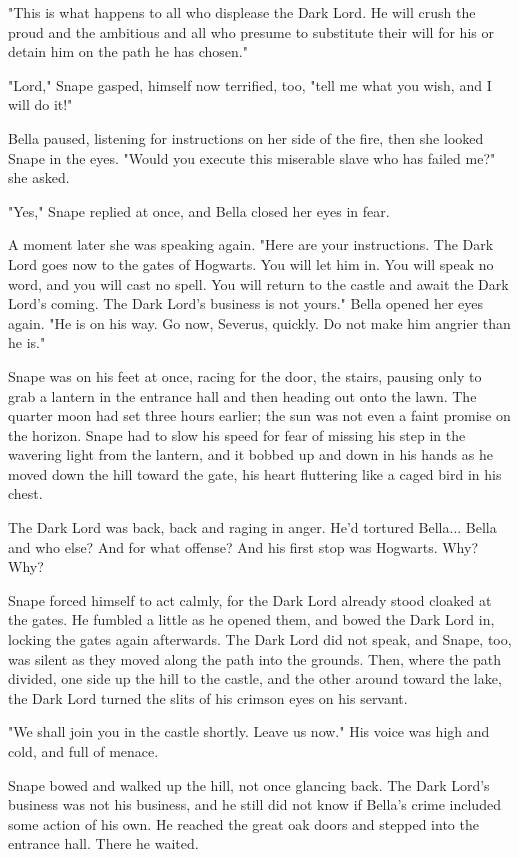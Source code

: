 "This is what happens to all who displease the Dark Lord. He will crush the proud and the ambitious and all who presume to substitute their will for his or detain him on the path he has chosen."

"Lord," Snape gasped, himself now terrified, too, "tell me what you wish, and I will do it!"

Bella paused, listening for instructions on her side of the fire, then she looked Snape in the eyes. "Would you execute this miserable slave who has failed me?" she asked.

"Yes," Snape replied at once, and Bella closed her eyes in fear.

A moment later she was speaking again. "Here are your instructions. The Dark Lord goes now to the gates of Hogwarts. You will let him in. You will speak no word, and you will cast no spell. You will return to the castle and await the Dark Lord's coming. The Dark Lord's business is not yours." Bella opened her eyes again. "He is on his way. Go now, Severus, quickly. Do not make him angrier than he is."

Snape was on his feet at once, racing for the door, the stairs, pausing only to grab a lantern in the entrance hall and then heading out onto the lawn. The quarter moon had set three hours earlier; the sun was not even a faint promise on the horizon. Snape had to slow his speed for fear of missing his step in the wavering light from the lantern, and it bobbed up and down in his hands as he moved down the hill toward the gate, his heart fluttering like a caged bird in his chest.

The Dark Lord was back, back and raging in anger. He'd tortured Bella... Bella and who else? And for what offense? And his first stop was Hogwarts. Why? Why?

Snape forced himself to act calmly, for the Dark Lord already stood cloaked at the gates. He fumbled a little as he opened them, and bowed the Dark Lord in, locking the gates again afterwards. The Dark Lord did not speak, and Snape, too, was silent as they moved along the path into the grounds. Then, where the path divided, one side up the hill to the castle, and the other around toward the lake, the Dark Lord turned the slits of his crimson eyes on his servant.

"We shall join you in the castle shortly. Leave us now." His voice was high and cold, and full of menace.

Snape bowed and walked up the hill, not once glancing back. The Dark Lord's business was not his business, and he still did not know if Bella's crime included some action of his own. He reached the great oak doors and stepped into the entrance hall. There he waited.

